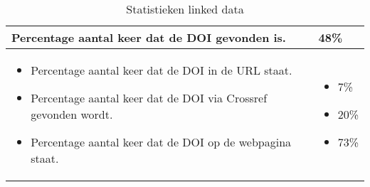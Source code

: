 \begin{table}[h!]
    \caption{Statistieken linked data}
    \centering
    \begin{tabularx}{\textwidth}{|X|p{4cm}|} 
        \hline
        Percentage aantal keer dat de DOI gevonden is.&48\%\\
        \hline
        \begin{itemize}
            \item Percentage aantal keer dat de DOI in de URL staat.
            \item Percentage aantal keer dat de DOI via Crossref gevonden wordt.
            \item Percentage aantal keer dat de DOI op de webpagina staat.
        \end{itemize}
        &
        \begin{itemize}
            \item 7\%
            \item 20\%
            \item 73\%
        \end{itemize}
        \\
        \hline
    \end{tabularx}
    \label{table:statistieken_linked_data}
\end{table}
